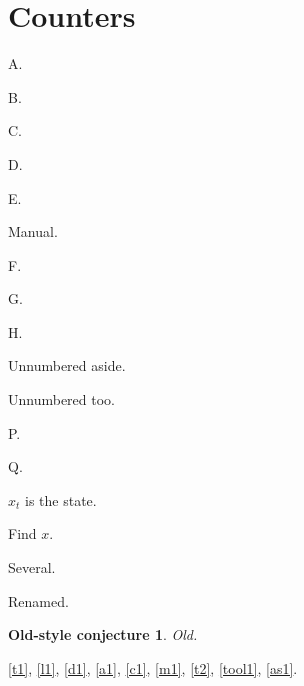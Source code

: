 \documentclass[lang=zh, thmnames=native, thmcounter=grouped, thmwithin=section,
  aliases=short, asides=unnumbered, thmname={corollary=系理}]{akizumi-note}
\newtheorem{conjecture}{Old-style conjecture}
\begin{document}
\section{Counters}
\begin{theorem}\label{t1} A. \end{theorem}
\begin{lemma}\label{l1} B. \end{lemma}
\begin{definition}\label{d1} C. \end{definition}
\begin{axiom}\label{a1} D. \end{axiom}
\begin{cor}\label{c1} E. \end{cor}
\begin{theorem}[number=7.3, note=Cram\'er--Wold]\label{m1} Manual. \end{theorem}
\begin{thm}[Named]\label{t2} F. \end{thm}
\begin{tool}\label{tool1} G. \end{tool}
\begin{assumption}\label{as1} H. \end{assumption}
\begin{example} Unnumbered aside. \end{example}
\begin{tip} Unnumbered too. \end{tip}
\begin{property} P. \end{property}
\begin{conclusion} Q. \end{conclusion}
\begin{notationthm} $x_t$ is the state. \end{notationthm}
\begin{problem} Find $x$. \end{problem}
\begin{remarks} Several. \end{remarks}
\begin{remark} Renamed. \end{remark}
\begin{conjecture}\label{cj} Old. \end{conjecture}
\begin{notation}\end{notation}

\cref{t1}, \cref{l1}, \cref{d1}, \cref{a1}, \cref{c1}, \cref{m1}, \cref{t2}, \cref{tool1}, \cref{as1}.
\end{document}
